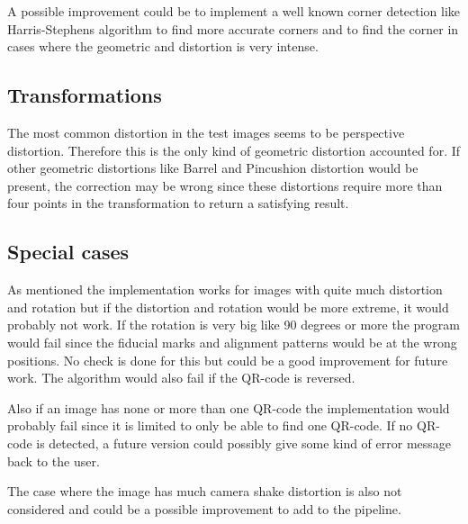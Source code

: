 \documentclass[12pt,a4paper]{article}
\begin{document}
A possible improvement could be to implement a well known corner detection like Harris-Stephens algorithm to find more accurate corners and to find the corner in cases where the geometric and distortion is very intense.

\subsection{Transformations}
The most common distortion in the test images seems to be perspective distortion. Therefore this is the only kind of geometric distortion accounted for. If other geometric distortions like Barrel and Pincushion distortion would be present, the correction may be wrong since these distortions require more than four points in the transformation to return a satisfying result.

\subsection{Special cases}
As mentioned the implementation works for images with quite much distortion and rotation but if the distortion and rotation would be more extreme, it would probably not work. If the rotation is very big like 90 degrees or more the program would fail since the fiducial marks and alignment patterns would be at the wrong positions. No check is done for this but could be a good improvement for future work. The algorithm would also fail if the QR-code is reversed.

Also if an image has none or more than one QR-code the implementation would probably fail since it is limited to only be able to find one QR-code. If no QR-code is detected, a future version could possibly give some kind of error message back to the user. 

The case where the image has much camera shake distortion \cite{cameradist} is also not considered and could be a possible improvement to add to the pipeline. 
 


{}

 
\end{document}
